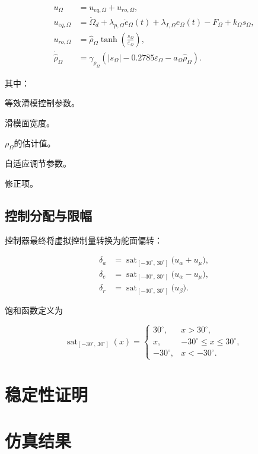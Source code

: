 \documentclass[11pt,a4paper,UTF8]{ctexart}
\begin{document}
\begin{equation}
\boxed{
\begin{aligned}
  u_{\Omega}
  &=u_{eq,\Omega}+u_{ro,\Omega},\\
  u_{eq,\Omega}
  &=\ddot{\Omega}_{d}
    +\lambda_{p,\Omega}\dot e_{\Omega}(t)
    +\lambda_{I,\Omega}e_{\Omega}(t)
    -F_{\Omega}+k_{\Omega}s_{\Omega},\\
  u_{ro,\Omega}
  &=\hat{\rho}_{\Omega}
    \tanh\!\left(\frac{s_{\Omega}}{\varepsilon_{\Omega}}\right),\\
  \dot{\hat{\rho}}_{\Omega}
  &=\gamma_{\rho_{\Omega}}
    \left(
      \lvert s_{\Omega}\rvert
      -0.2785\varepsilon_{\Omega}
      -a_{\Omega}\hat{\rho}_{\Omega}
    \right).
\end{aligned}
}
\end{equation}

其中：

\begin{description}[style=nextline,leftmargin=7.5em,labelsep=0.8em]
  \item[$k_{\Omega}>0$] 等效滑模控制参数。
  \item[$\varepsilon_{\Omega}>0$] 滑模面宽度。
  \item[$\hat{\rho}_{\Omega}$] $\rho_{\Omega}$的估计值。
  \item[$\gamma_{\rho_{\Omega}}>0$] 自适应调节参数。
  \item[$a_{\Omega}>0$] 修正项。
\end{description}

\subsection{控制分配与限幅}

控制器最终将虚拟控制量转换为舵面偏转：

\begin{equation}
\begin{aligned}
  \delta_a
  &=\operatorname{sat}_{[-30^{\circ},\,30^{\circ}]}
    \bigl(u_{\alpha}+u_{\mu}\bigr),\\
  \delta_e
  &=\operatorname{sat}_{[-30^{\circ},\,30^{\circ}]}
    \bigl(u_{\alpha}-u_{\mu}\bigr),\\
  \delta_r
  &=\operatorname{sat}_{[-30^{\circ},\,30^{\circ}]}
    \bigl(u_{\beta}\bigr).
\end{aligned}
\end{equation}

饱和函数定义为

\begin{equation}
  \operatorname{sat}_{[-30^{\circ},\,30^{\circ}]}(x)
  =
  \begin{cases}
    30^{\circ}, & x>30^{\circ},\\
    x, & -30^{\circ}\leq x\leq 30^{\circ},\\
    -30^{\circ}, & x<-30^{\circ}.
  \end{cases}
\end{equation}

\section{稳定性证明}

\section{仿真结果}
\end{document}
